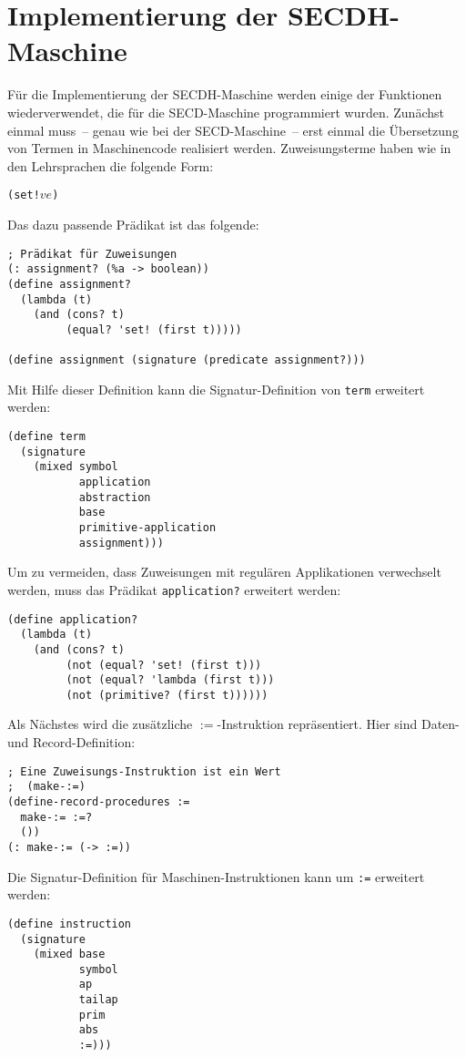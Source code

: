 \section{Implementierung der SECDH-Maschine}


Für die Implementierung der SECDH-Maschine werden einige der
Funktionen wiederverwendet, die für die SECD-Maschine programmiert
wurden.  Zunächst einmal muss~-- genau wie bei der SECD-Maschine~--
erst einmal die Übersetzung von Termen in Maschinencode realisiert
werden.  Zuweisungsterme haben wie in den Lehrsprachen die folgende Form:
%
\begin{alltt}
(set! \(v\) \(e\))
\end{alltt}
%
Das dazu passende Prädikat ist das folgende:
%
\begin{verbatim}
; Prädikat für Zuweisungen
(: assignment? (%a -> boolean))
(define assignment?
  (lambda (t)
    (and (cons? t)
         (equal? 'set! (first t)))))

(define assignment (signature (predicate assignment?)))
\end{verbatim}
%
Mit Hilfe dieser Definition kann die Signatur-Definition von
\texttt{term} erweitert werden:
%
\begin{verbatim}
(define term
  (signature
    (mixed symbol
           application
           abstraction
           base
           primitive-application
           assignment)))
\end{verbatim}
%
Um zu vermeiden, dass Zuweisungen mit regulären Applikationen
verwechselt werden, muss das Prädikat \texttt{application?} erweitert
werden:
%
\begin{verbatim}
(define application?
  (lambda (t)
    (and (cons? t)
         (not (equal? 'set! (first t)))
         (not (equal? 'lambda (first t)))
         (not (primitive? (first t))))))
\end{verbatim}
%
Als Nächstes wird die zusätzliche $\mathtt{:=}$-Instruktion
repräsentiert.  Hier sind Daten- und Record-Definition:
%
\begin{verbatim}
; Eine Zuweisungs-Instruktion ist ein Wert
;  (make-:=)
(define-record-procedures :=
  make-:= :=?
  ())
(: make-:= (-> :=))
\end{verbatim}
%
Die Signatur-Definition für Maschinen-Instruktionen kann um \texttt{:=}
erweitert werden:
%
\begin{verbatim}
(define instruction
  (signature
    (mixed base
           symbol
           ap
           tailap
           prim
           abs
           :=)))
\end{verbatim}

